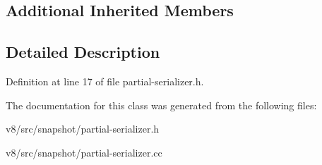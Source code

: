 \subsection*{Additional Inherited Members}


\subsection{Detailed Description}


Definition at line 17 of file partial-\/serializer.\+h.



The documentation for this class was generated from the following files\+:\begin{DoxyCompactItemize}
\item 
v8/src/snapshot/partial-\/serializer.\+h\item 
v8/src/snapshot/partial-\/serializer.\+cc\end{DoxyCompactItemize}
